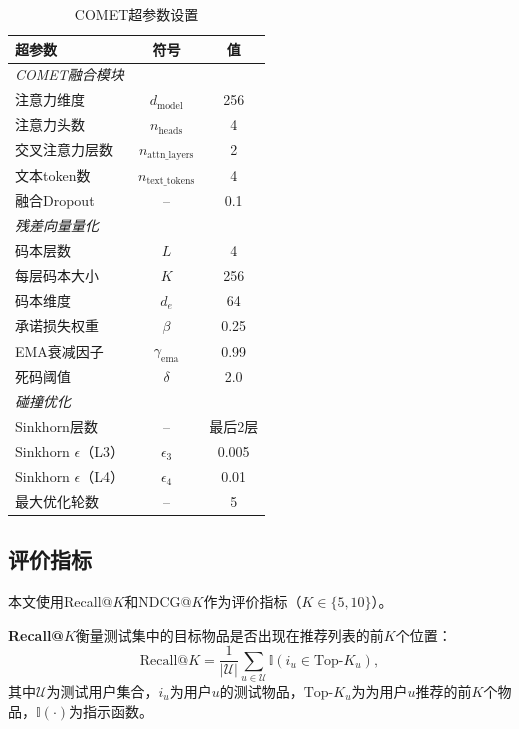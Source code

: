 \begin{table}[htbp]
  \centering
  \caption{COMET超参数设置}
  \label{tab:hyperparams}
  \begin{tabular}{lcc}
    \toprule
    超参数 & 符号 & 值 \\
    \midrule
    \multicolumn{3}{l}{\textit{COMET融合模块}} \\
    注意力维度 & $d_{\text{model}}$ & 256 \\
    注意力头数 & $n_{\text{heads}}$ & 4 \\
    交叉注意力层数 & $n_{\text{attn\_layers}}$ & 2 \\
    文本token数 & $n_{\text{text\_tokens}}$ & 4 \\
    融合Dropout & -- & 0.1 \\
    \midrule
    \multicolumn{3}{l}{\textit{残差向量量化}} \\
    码本层数 & $L$ & 4 \\
    每层码本大小 & $K$ & 256 \\
    码本维度 & $d_e$ & 64 \\
    承诺损失权重 & $\beta$ & 0.25 \\
    EMA衰减因子 & $\gamma_{\text{ema}}$ & 0.99 \\
    死码阈值 & $\delta$ & 2.0 \\
    \midrule
    \multicolumn{3}{l}{\textit{碰撞优化}} \\
    Sinkhorn层数 & -- & 最后2层 \\
    Sinkhorn $\epsilon$（L3） & $\epsilon_3$ & 0.005 \\
    Sinkhorn $\epsilon$（L4） & $\epsilon_4$ & 0.01 \\
    最大优化轮数 & -- & 5 \\
    \bottomrule
  \end{tabular}
\end{table}

\subsection{评价指标}

本文使用Recall@$K$和NDCG@$K$作为评价指标（$K \in \{5, 10\}$）。

\textbf{Recall@$K$}衡量测试集中的目标物品是否出现在推荐列表的前$K$个位置：
\begin{equation}
  \text{Recall@}K = \frac{1}{|\mathcal{U}|} \sum_{u \in \mathcal{U}} \mathbb{I}(i_u \in \text{Top-}K_u),
\end{equation}
其中$\mathcal{U}$为测试用户集合，$i_u$为用户$u$的测试物品，$\text{Top-}K_u$为为用户$u$推荐的前$K$个物品，$\mathbb{I}(\cdot)$为指示函数。

